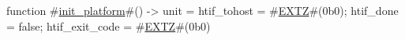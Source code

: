 function #\hyperref[sailRISCVzinitzyplatform]{init\_platform}#() -> unit = {
  htif_tohost = #\hyperref[sailRISCVzEXTZ]{EXTZ}#(0b0);
  htif_done   = false;
  htif_exit_code = #\hyperref[sailRISCVzEXTZ]{EXTZ}#(0b0)
}
